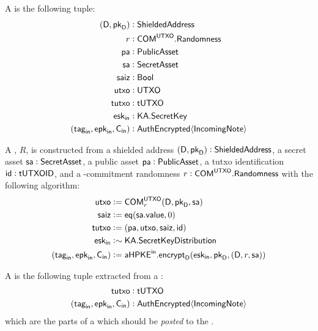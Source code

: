 \begin{definition}
    A \Receiver{} is the following tuple:
    \begin{align*}
        (\textsf{D}, \pkD)     &: \ShieldedAddress \\
        r                      &: \COM^\UTXO.\Randomness \\
        \pa                    &: \PublicAsset \\
        \sa                    &: \SecretAsset \\
        \saiz                   &: \Bool \\
        \utxo                    &: \UTXO \\
        \tutxo                 &: \TUTXO \\
        \eskin                 &: \KA.\SecretKey \\
        (\tagin, \epkin, \Cin) &: \AuthEncrypted\bra{\IncomingNote}
    \end{align*}
    
    A \Receiver{}, $R$, is constructed from a shielded address $(\textsf{D}, \pkD) : \ShieldedAddress$, a secret asset $\sa : \SecretAsset$, a public asset $\pa : \PublicAsset$, a tutxo identification $\ID: \tUTXOID$, and a 
    \UTXO{}-commitment randomness $r : \COM^\UTXO.\Randomness$ with the following algorithm:
    \begin{align*}
        \utxo                    &:= \COM^{\UTXO}_r(\textsf{D}, \pkD, \sa) \\
        \saiz                   &:= \eq(\sa.\VALUE, 0) \\
        \tutxo                 &:= (\pa, \utxo, \saiz, \ID) \\
        \eskin                 &:\sim \KA.\SecretKeyDistribution \\
        (\tagin, \epkin, \Cin) &:= \aHPKEin.\encrypt_\textsf{D}(\eskin, \pkD, (\textsf{D}, r, \sa))
    \end{align*}
\end{definition}

\begin{definition}
    A \ReceiverPost{} is the following tuple extracted from a \Receiver{}:
    \begin{align*}
        \tutxo                    &: \TUTXO \\
        (\tagin, \epkin, \Cin) &: \AuthEncrypted\bra{\IncomingNote}
    \end{align*}
    which are the parts of a \Receiver{} which should be \emph{posted} to the \Ledger{}.
\end{definition}

